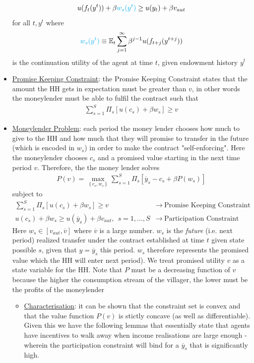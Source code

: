 \documentclass{article}
\begin{document}
\begin{itemize}
\begin{gather*}
        u(f_{t}(y^{t})) + \beta \begingroup\color{cyan} w_{s}(y^{t}) \endgroup \geq u(y_{t}) + \beta v_{aut}
    \end{gather*}
    for all $t, y^{t}$ where
    \begin{gather*}
        \begingroup\color{cyan} w_{s}(y^{t}) \endgroup \equiv \mathbb{E}_{t} \sum_{j=1}^{\infty} \beta^{j-1} u(f_{t+j} (y^{t+j}))
    \end{gather*}
    is the continuation utility of the agent at time $t$, given endowment history $y^{t}$
    \item  \underline{Promise Keeping Constraint}: the Promise Keeping Constraint states that the amount the HH gets in expectation must be greater than $v$, in other words the moneylender must be able to fulfil the contract such that
    \begin{gather*}
        \sum_{s=1}^{S} \Pi_{s} [u(c_{s}) + \beta w_{s}] \geq v
    \end{gather*}
    \item  \underline{Moneylender Problem}: each period the money lender chooses how much to give to the HH and how much that they will promise to transfer in the future (which is encoded in $w_{s}$) in order to make the contract "self-enforcing". Here the moneylender chooses $c_{s}$ and a promised value starting in the next time period $v$. Therefore, the the money lender solves
    \begin{gather*}
        P(v) = \max_{\left\{ c_{s}, w_{s} \right\} } \sum_{s=1}^{S} \Pi_{s} [\overline{y}_{s} - c_{s} + \beta P(w_{s})]
    \end{gather*}
    subject to
    \begin{align*}
        \sum_{s=1}^{S} \Pi_{s} [u(c_{s}) + \beta w_{s}] \geq v & \rightarrow \ \text{Promise Keeping Constraint} \\
        u(c_{s}) + \beta w_{s} \geq u(\overline{y}_{s}) + \beta v_{aut}, \ \ s = 1, \dots, S & \rightarrow \ \text{Participation Constraint}
    \end{align*}
    Here $w_{s} \in [v_{aut}, \overline{v}]$ where $\overline{v}$ is a large number. $w_{s}$ is the \textit{future} (i.e. next period) realized transfer under the contract established at time $t$ given state possible $s$, given that $y = \overline{y}_{s}$ this period. $w_{s}$ therefore represents the promised value which the HH will enter next period). We treat promised utility $v$ as a state variable for the HH. Note that $P$ must be a decreasing function of $v$ because the higher the consumption stream of the villager, the lower must be the profits of the moneylender
    \begin{itemize}
        \item  \underline{Characterisation}: it can be shown that the constraint set is convex and that the value function $P(v)$ is stictly concave (as well as differentiable). Given this we have the following lemmas that essentially state that agents have incentives to walk away when income realisations are large enough - wherein the participation constraint will bind for a $\overline{y}_{s}$ that is significantly high.


\end{itemize}
\end{itemize}
\end{document}
